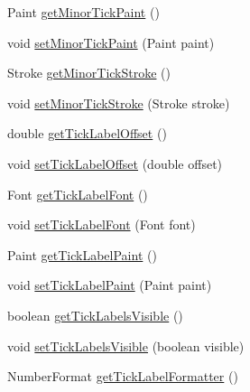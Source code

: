 \begin{DoxyCompactItemize}
\item 
Paint \mbox{\hyperlink{classorg_1_1jfree_1_1chart_1_1plot_1_1dial_1_1_standard_dial_scale_a3ba7b8e13c817d68f981b5e918be5a41}{get\+Minor\+Tick\+Paint}} ()
\item 
void \mbox{\hyperlink{classorg_1_1jfree_1_1chart_1_1plot_1_1dial_1_1_standard_dial_scale_a5a11cdd5bfc905c2a7b7fe1185845b3d}{set\+Minor\+Tick\+Paint}} (Paint paint)
\item 
Stroke \mbox{\hyperlink{classorg_1_1jfree_1_1chart_1_1plot_1_1dial_1_1_standard_dial_scale_ae0bf68d6ba42c669e91a13992976284e}{get\+Minor\+Tick\+Stroke}} ()
\item 
void \mbox{\hyperlink{classorg_1_1jfree_1_1chart_1_1plot_1_1dial_1_1_standard_dial_scale_a5fe083a0e5dfb8877002fbc2070b4d00}{set\+Minor\+Tick\+Stroke}} (Stroke stroke)
\item 
double \mbox{\hyperlink{classorg_1_1jfree_1_1chart_1_1plot_1_1dial_1_1_standard_dial_scale_aec3bd74b6d8c18c65ebcaa9599781091}{get\+Tick\+Label\+Offset}} ()
\item 
void \mbox{\hyperlink{classorg_1_1jfree_1_1chart_1_1plot_1_1dial_1_1_standard_dial_scale_a66505d5c5edc03ab1c77086635fff6c7}{set\+Tick\+Label\+Offset}} (double offset)
\item 
Font \mbox{\hyperlink{classorg_1_1jfree_1_1chart_1_1plot_1_1dial_1_1_standard_dial_scale_a5647e1d012b0291f4ad887bdbd078209}{get\+Tick\+Label\+Font}} ()
\item 
void \mbox{\hyperlink{classorg_1_1jfree_1_1chart_1_1plot_1_1dial_1_1_standard_dial_scale_a1c9ce1462e74db6a73a00b98214a975d}{set\+Tick\+Label\+Font}} (Font font)
\item 
Paint \mbox{\hyperlink{classorg_1_1jfree_1_1chart_1_1plot_1_1dial_1_1_standard_dial_scale_a002b4a74a779d669ef689dd9531377f7}{get\+Tick\+Label\+Paint}} ()
\item 
void \mbox{\hyperlink{classorg_1_1jfree_1_1chart_1_1plot_1_1dial_1_1_standard_dial_scale_a9328a314f07c55da46004bf450bc9627}{set\+Tick\+Label\+Paint}} (Paint paint)
\item 
boolean \mbox{\hyperlink{classorg_1_1jfree_1_1chart_1_1plot_1_1dial_1_1_standard_dial_scale_af28005e1d3f175d9fb695830299d9852}{get\+Tick\+Labels\+Visible}} ()
\item 
void \mbox{\hyperlink{classorg_1_1jfree_1_1chart_1_1plot_1_1dial_1_1_standard_dial_scale_a24d62a6c1edcfb5c5969fcb338231fe9}{set\+Tick\+Labels\+Visible}} (boolean visible)
\item 
Number\+Format \mbox{\hyperlink{classorg_1_1jfree_1_1chart_1_1plot_1_1dial_1_1_standard_dial_scale_a361416a0a85e68c93d457c87ac1e6e28}{get\+Tick\+Label\+Formatter}} ()

\end{DoxyCompactItemize}
